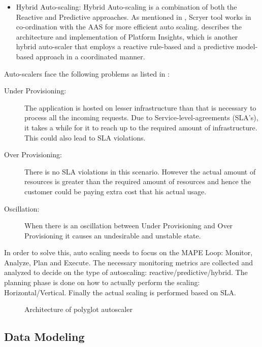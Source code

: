 \documentclass[article,type=msc,colorback,12pt,accentcolor=tud7b,table]{tudthesis}
\begin{document}
\begin{itemize}
\item{Hybrid Auto-scaling: } Hybrid Auto-scaling is a combination of both the Reactive and Predictive approaches. As mentioned in \cite{Scryer1}, Scryer tool works in co-ordination with the AAS for more efficient auto scaling. \cite{moore2013coordinated} describes the architecture and implementation of Platform Insights, which is another hybrid auto-scaler that employs a reactive rule-based and a predictive model-based approach in a coordinated manner.
\end{itemize}
Auto-scalers face the following problems as listed in \cite{lorido2014review}:
\begin{description}
	\item[Under Provisioning:] The application is hosted on lesser infrastructure than that is necessary to process all the incoming requests. Due to Service-level-agreements (SLA's), it takes a while for it to reach up to the required amount of infrastructure. This could also lead to SLA violations.
	
	\item[Over Provisioning:] There is no SLA violations in this scenario. However the actual amount of resources is greater than the required amount of resources and hence the customer could be paying extra cost that his actual usage.
	
	\item[Oscillation:]
		When there is an oscillation between Under Provisioning and Over Provisioning it causes an undesirable and unstable state. 
\end{description}

In order to solve this, auto scaling needs to focus on the MAPE Loop\cite{lorido2014review}: Monitor, Analyze, Plan and Execute. The necessary monitoring metrics are collected and analyzed to decide on the type of autoscaling: reactive/predictive/hybrid. The planning phase is done on how to actually perform the scaling: Horizontal/Vertical. Finally the actual scaling is performed based on SLA.

 \begin{figure}
 \begin{center}
  \makebox[\textwidth]{\texttt{[image: B4]}}
\end{center}
\caption{Architecture of polyglot autoscaler \cite{seelam2015polyglot}}
\end{figure}

	\subsection{Data Modeling}
	
\end{document}
